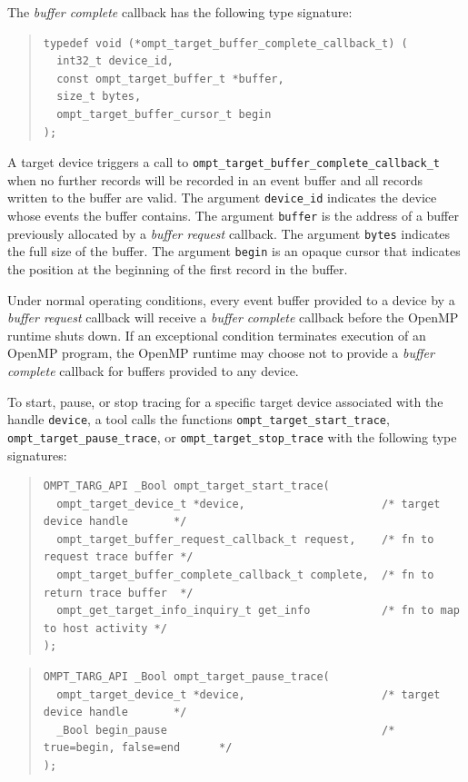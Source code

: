 \documentclass{article}
\begin{document}
The \emph{buffer complete} callback has the following type signature: 
\begin{quote}
\begin{verbatim}
typedef void (*ompt_target_buffer_complete_callback_t) (
  int32_t device_id, 
  const ompt_target_buffer_t *buffer,
  size_t bytes,
  ompt_target_buffer_cursor_t begin
);
\end{verbatim}
\end{quote}
A target device triggers a call to \verb|ompt_target_buffer_complete_callback_t| when no further records will be recorded in an event buffer and all records written to the buffer are valid. 
The argument \verb|device_id| indicates the device whose events the buffer contains. The argument \verb|buffer| is the address of a buffer previously allocated by a \emph{buffer request} callback. The argument \verb|bytes| indicates the full size of the buffer. The argument \verb|begin| is an opaque cursor that indicates the position at the beginning of the first record in the buffer.

Under normal operating conditions, every event buffer provided to a device by a \emph{buffer request} callback will receive a \emph{buffer complete} callback before the OpenMP runtime shuts down. If an exceptional condition terminates  execution of an OpenMP program, the OpenMP runtime may choose not to provide a \emph{buffer complete} callback for buffers provided to any device.

To start, pause, or stop tracing for a specific target device associated with the handle \verb|device|, 
a tool calls the functions \verb|ompt_target_start_trace|, \verb|ompt_target_pause_trace|, or \verb|ompt_target_stop_trace| with the following type signatures:
\begin{quote}
\begin{verbatim}
OMPT_TARG_API _Bool ompt_target_start_trace(
  ompt_target_device_t *device,                     /* target device handle       */
  ompt_target_buffer_request_callback_t request,    /* fn to request trace buffer */
  ompt_target_buffer_complete_callback_t complete,  /* fn to return trace buffer  */
  ompt_get_target_info_inquiry_t get_info           /* fn to map to host activity */
);
\end{verbatim}
\end{quote}

\begin{quote}
\begin{verbatim}
OMPT_TARG_API _Bool ompt_target_pause_trace(
  ompt_target_device_t *device,                     /* target device handle       */
  _Bool begin_pause                                 /* true=begin, false=end      */
);
\end{verbatim}
\end{quote}
\end{document}
